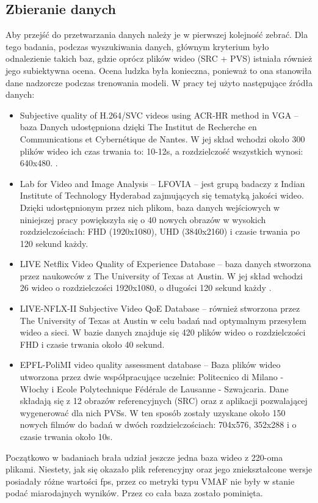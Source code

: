 \subsection{Zbieranie danych}
Aby przejść do przetwarzania danych należy je w pierwszej kolejność zebrać. Dla tego badania, podczas wyszukiwania danych, głównym kryterium było odnalezienie takich baz, gdzie oprócz plików wideo (SRC + PVS) istniała również jego subiektywna ocena. Ocena ludzka była konieczna, ponieważ to ona stanowiła dane nadzorcze podczas trenowania modeli. W pracy tej użyto następujące źródła danych:
\begin{itemize}
\item Subjective quality of H.264/SVC videos using ACR-HR method in VGA -- baza Danych udostępniona dzięki The Institut de Recherche en Communications et Cybernétique de Nantes. W jej skład wchodzi około 300 plików wideo ich czas trwania to: 10-12s, a rozdzielczość wszystkich wynosi: 640x480. \cite{pitrey:hal-00608310}.
\item Lab for Video and Image Analysis – LFOVIA -- jest grupą badaczy z Indian Institute of Technology Hyderabad zajmujących się tematyką jakości wideo. Dzięki udostępnionym przez nich plikom,  baza danych wejściowych w niniejszej pracy powiększyła się o 40 nowych obrazów w wysokich rozdzielczościach: FHD (1920x1080), UHD (3840x2160) i czasie trwania po 120 sekund każdy\cite{india}.
\item LIVE Netflix Video Quality of Experience Database -- baza danych stworzona przez naukowców z The University of Texas at Austin. W jej skład wchodzi 26 wideo o rozdzielczości 1920x1080, o długości 120 sekund każdy \cite{netflix_1}\cite{netflix_11}.
\item LIVE-NFLX-II Subjective Video QoE Database -- również stworzona przez The University of Texas at Austin w celu badań nad optymalnym przesyłem wideo a sieci. W bazie danych znajduje się 420 plików wideo o rozdzielczości FHD i czasie trwania około 40 sekund.
\item EPFL-PoliMI video quality assessment database -- Baza plików wideo utworzona przez dwie współpracujące uczelnie: Politecnico di Milano - Włochy i Ecole Polytechnique Fédérale de Lausanne - Szwajcaria. Dane składają się z 12 obrazów referencyjnych (SRC) oraz z aplikacji pozwalającej wygenerować dla nich PVSs. W ten sposób zostały uzyskane około 150 nowych filmów do badań w dwóch rozdzielczościach: 704x576, 352x288 i o czasie trwania około 10s\cite{italy}\cite{italy_2}\cite{italy_3}.
\end{itemize}
Początkowo w badaniach brała udział jeszcze jedna baza wideo z 220-oma plikami. Niestety, jak się okazało plik referencyjny oraz jego zniekształcone wersje posiadały różne wartości fps, przez co metryki typu VMAF nie były w stanie podać miarodajnych wyników. Przez co cała baza zostało pominięta.\par

